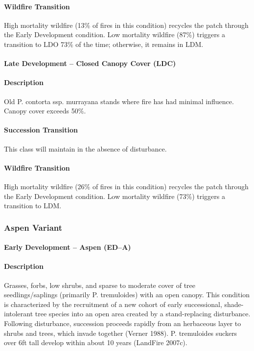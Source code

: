 \paragraph{Wildfire Transition} High mortality wildfire (13\% of fires in this condition) recycles the patch through the Early Development condition. Low mortality wildfire (87\%) triggers a transition to LDO 73\% of the time; otherwise, it remains in LDM.

\noindent\hrulefill

\paragraph{Late Development – Closed Canopy Cover (LDC)}

\paragraph{Description} Old P. contorta ssp. murrayana stands where fire has had minimal influence. Canopy cover exceeds 50\%.

\paragraph{Succession Transition} This class will maintain in the absence of disturbance.

\paragraph{Wildfire Transition} High mortality wildfire (26\% of fires in this condition) recycles the patch through the Early Development condition. Low mortality wildfire (73\%) triggers a transition to LDM.

\noindent\hrulefill
\noindent\hrulefill

\subsubsection{Aspen Variant}

\paragraph{Early Development – Aspen (ED–A)}

\paragraph{Description} Grasses, forbs, low shrubs, and sparse to moderate cover of tree seedlings/saplings (primarily P. tremuloides) with an open canopy. This condition is characterized by the recruitment of a new cohort of early successional, shade-intolerant tree species into an open area created by a stand-replacing disturbance. 
Following disturbance, succession proceeds rapidly from an herbaceous layer to shrubs and trees, which invade together (Verner 1988). P. tremuloides suckers over 6ft tall develop within about 10 years (LandFire 2007c). 


